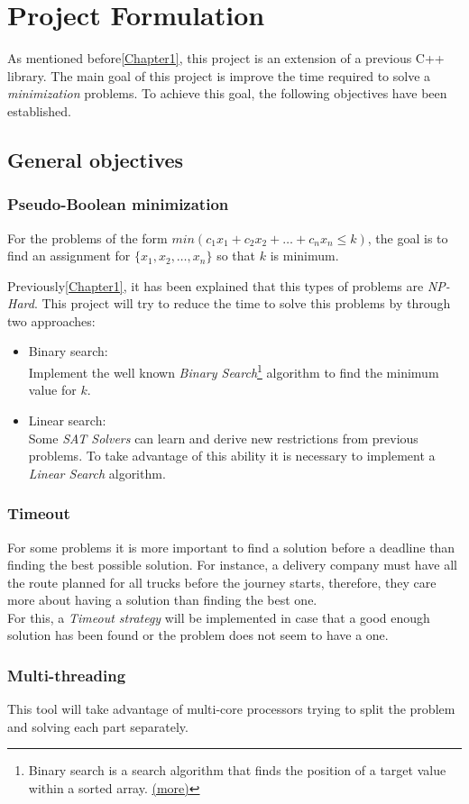 \chapter{Project Formulation} %

\label{Chapter2} %

As mentioned before\ref{Chapter1}, this project is an extension of a previous C++ library. The main goal of this project is improve the time required to solve a \emph{minimization} problems. To achieve this goal, the following objectives have been established. 

\section{General objectives}

\subsection{Pseudo-Boolean minimization}
For the problems of the form $min(c_{1}x_{1}+c_{2}x_{2}+\ldots +c_{n}x_{n} \leq k)$, the goal is to find an assignment for $\{x_{1},x_{2},\ldots,x_{n}\}$ so that $k$ is minimum.

Previously\ref{Chapter1}, it has been explained that this types of problems are \emph{NP-Hard}. This project will try to reduce the time to solve this problems by through two approaches:
\begin{itemize}
	\item Binary search:\\
		Implement the well known \emph{Binary Search}\footnote{Binary search is a search algorithm that finds the position of a target value within a sorted array. \href{https://en.wikipedia.org/wiki/Binary_search_algorithm}{(more)}} algorithm to find the minimum value for $k$.
	\item Linear search:\\
		Some \emph{SAT Solvers} can learn and derive new restrictions from previous problems. To take advantage of this ability it is necessary to implement a \emph{Linear Search} algorithm.
\end{itemize}

\subsection{Timeout}
For some problems it is more important to find a solution before a deadline than finding the best possible solution. For instance, a delivery company must have all the route planned for all trucks before the journey starts, therefore, they care more about having a solution than finding the best one.\\
For this, a \emph{Timeout strategy} will be implemented in case that a good enough solution has been found or the problem does not seem to have a one. 
\subsection{Multi-threading}
This tool will take advantage of multi-core processors trying to split the problem and solving each part separately.
